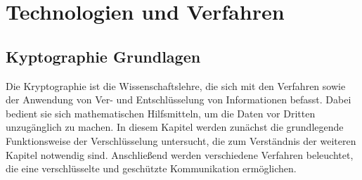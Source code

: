 \documentclass  [paper=a4,
				fontsize=12pt,
				listof=totoc,
				bibliography=totoc
				]{scrreprt}
\begin{document}
	
	\chapter{Technologien und Verfahren}
		\section{Kyptographie Grundlagen}
				Die Kryptographie ist die Wissenschaftslehre, die sich mit den Verfahren sowie der Anwendung von Ver- und Entschlüsselung von Informationen befasst. Dabei bedient sie sich mathematischen Hilfsmitteln, um die Daten vor Dritten unzugänglich zu machen. In diesem Kapitel werden zunächst die grundlegende Funktionsweise der Verschlüsselung untersucht, die zum Verständnis der weiteren Kapitel notwendig sind. Anschließend werden verschiedene Verfahren beleuchtet, die eine verschlüsselte und geschützte Kommunikation ermöglichen.
\end{document}

